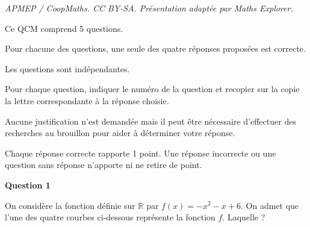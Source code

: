 \documentclass[10pt]{article}
\providecommand{\R}{\mathbb{R}}
\begin{document}
\noindent\textit{APMEP / CoopMaths. CC BY-SA. Présentation adaptée par Maths Explorer.}\par\medskip
\medskip

Ce QCM comprend 5 questions.

Pour chacune des questions, une seule des quatre réponses proposées est correcte.

Les questions sont indépendantes.

Pour chaque question, indiquer le numéro de la question et recopier sur la copie la lettre
correspondante à la réponse choisie.

Aucune justification n'est demandée mais il peut être nécessaire d'effectuer des recherches au
brouillon pour aider à déterminer votre réponse.

Chaque réponse correcte rapporte 1 point. Une réponse incorrecte ou une question sans réponse
n'apporte ni ne retire de point.

\medskip

\textbf{Question 1}

\medskip 

On considère la fonction définie sur $\R$ par $f(x) = -x^2 - x + 6$. On admet que l'une
des quatre courbes ci-dessous représente la fonction $f$. Laquelle ?
\end{document}
